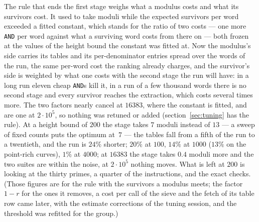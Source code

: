 \documentclass[12pt,a4paper,oneside]{amsart}
\begin{document}
The rule that ends the first stage weighs what a modulus costs and what its
survivors cost. It used to take moduli while the expected survivors per word
exceeded a fitted constant, which stands for the ratio of two costs --- one
more \texttt{AND} per word against what a surviving word costs from there on
--- both frozen at the values of the height bound the constant was fitted at.
Now the modulus's side carries its tables and its per-denominator entries
spread over the words of the run, the same per-word cost the ranking already
charges, and the survivor's side is weighted by what one costs with the
second stage the run will have: in a long run eleven cheap \texttt{AND}s
kill it, in a run of a few thousand words there is no second stage and every
survivor reaches the extraction, which costs several times more. The two
factors nearly cancel at $16383$, where the constant is fitted, and are one
at $2\cdot 10^5$, so nothing was retuned or added (section~\ref{sec:tuning}
has the rule). At a height bound of $200$ the stage takes $7$ moduli instead
of $13$ --- a sweep of fixed counts puts the optimum at~$7$ --- the tables
fall from a fifth of the run to a twentieth, and the run is $24\%$ shorter;
$20\%$ at $100$, $14\%$ at $1000$ ($13\%$ on the point-rich curves), $1\%$
at $4000$; at $16383$ the stage takes $0.4$ moduli more and the two suites
are within the noise, at $2\cdot 10^5$ nothing moves. What is left at $200$
is looking at the thirty primes, a quarter of the instructions, and the
exact checks. (Those figures are for the rule with the survivors a modulus
meets; the factor $1-r$ for the ones it removes, a cost per call of the sieve
and the fetch of its table row came later, with the estimate corrections of
the tuning session, and the threshold was refitted for the group.)
\end{document}
